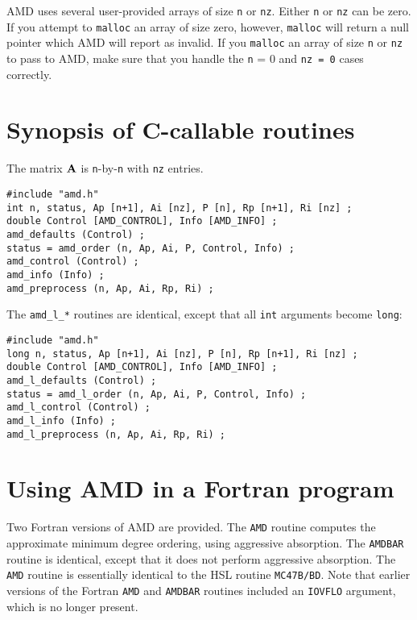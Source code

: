 \documentclass[11pt]{article}
\newcommand{\m}[1]{{\bf{#1}}}       %
\begin{document}
AMD uses several user-provided arrays of size {\tt n} or {\tt nz}.
Either {\tt n} or {\tt nz} can be zero.
If you attempt to {\tt malloc} an array of size zero,
however, {\tt malloc} will return a null pointer which AMD will report
as invalid.  If you {\tt malloc} an array of
size {\tt n} or {\tt nz} to pass to AMD, make sure that you handle the
{\tt n} = 0 and {\tt nz = 0} cases correctly.

\section{Synopsis of C-callable routines}
\label{Synopsis}

The matrix $\m{A}$ is {\tt n}-by-{\tt n} with {\tt nz} entries.

{\footnotesize
\begin{verbatim}
#include "amd.h"
int n, status, Ap [n+1], Ai [nz], P [n], Rp [n+1], Ri [nz] ;
double Control [AMD_CONTROL], Info [AMD_INFO] ;
amd_defaults (Control) ;
status = amd_order (n, Ap, Ai, P, Control, Info) ;
amd_control (Control) ;
amd_info (Info) ;
amd_preprocess (n, Ap, Ai, Rp, Ri) ;
\end{verbatim}
}

The {\tt amd\_l\_*} routines are identical, except that all {\tt int}
arguments become {\tt long}:

{\footnotesize
\begin{verbatim}
#include "amd.h"
long n, status, Ap [n+1], Ai [nz], P [n], Rp [n+1], Ri [nz] ;
double Control [AMD_CONTROL], Info [AMD_INFO] ;
amd_l_defaults (Control) ;
status = amd_l_order (n, Ap, Ai, P, Control, Info) ;
amd_l_control (Control) ;
amd_l_info (Info) ;
amd_l_preprocess (n, Ap, Ai, Rp, Ri) ;
\end{verbatim}
}

\section{Using AMD in a Fortran program}

Two Fortran versions of AMD are provided.  The {\tt AMD} routine computes the
approximate minimum degree ordering, using aggressive absorption.  The
{\tt AMDBAR} routine is identical, except that it does not perform aggressive
absorption.  The {\tt AMD} routine is essentially identical to the HSL
routine {\tt MC47B/BD}.
Note that earlier versions of the Fortran
{\tt AMD} and {\tt AMDBAR} routines included an {\tt IOVFLO} argument,
which is no longer present.
\end{document}
